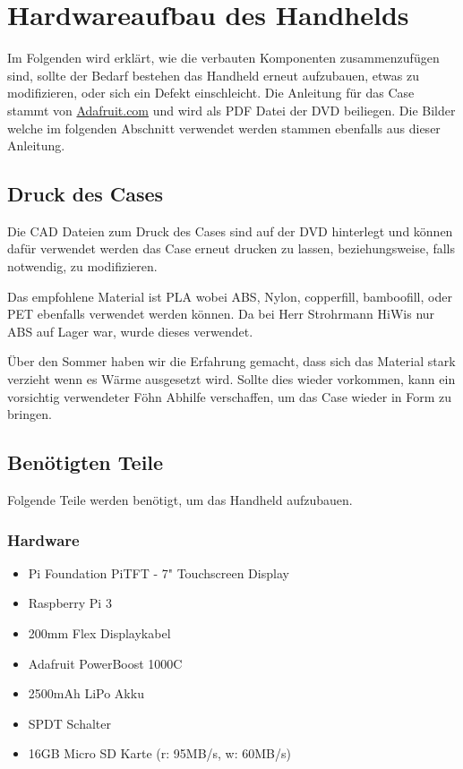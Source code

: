 %
%

\chapter{Hardwareaufbau des Handhelds}

Im Folgenden wird erklärt, wie die verbauten Komponenten zusammenzufügen sind, sollte der Bedarf bestehen das Handheld erneut aufzubauen, etwas zu modifizieren, oder sich ein Defekt einschleicht. Die Anleitung für das Case stammt von \url{Adafruit.com} und wird als PDF Datei der DVD beiliegen. Die Bilder welche im folgenden Abschnitt verwendet werden stammen ebenfalls aus dieser Anleitung.

\section{Druck des Cases}

Die CAD Dateien zum Druck des Cases sind auf der DVD hinterlegt und können dafür verwendet werden das Case erneut drucken zu lassen, beziehungsweise, falls notwendig, zu modifizieren. 

Das empfohlene Material ist PLA wobei ABS, Nylon, copperfill, bamboofill, oder PET ebenfalls verwendet werden können. Da bei Herr Strohrmann HiWis nur ABS auf Lager war, wurde dieses verwendet. 

Über den Sommer haben wir die Erfahrung gemacht, dass sich das Material stark verzieht wenn es Wärme ausgesetzt wird. Sollte dies wieder vorkommen, 	 kann ein vorsichtig verwendeter Föhn Abhilfe verschaffen, um das Case wieder in Form zu bringen. 

\section{Benötigten Teile}
Folgende Teile werden benötigt, um das Handheld aufzubauen.

\newpage
\subsection{Hardware}
\begin{itemize}
\item Pi Foundation PiTFT - 7" Touchscreen Display 
\item Raspberry Pi 3 
\item 200mm Flex Displaykabel
\item Adafruit PowerBoost 1000C
\item 2500mAh LiPo Akku
\item SPDT Schalter
\item 16GB  Micro SD Karte (r: 95MB/s, w: 60MB/s)
\end{itemize} 

